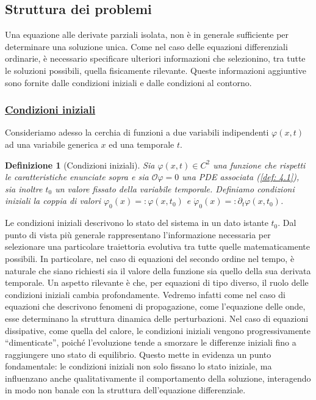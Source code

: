 \documentclass[a4paper,12pt]{report}
\newtheorem{definizione}{Definizione}[chapter]
\begin{document}
\newpage
\subsection{Struttura dei problemi}

Una equazione alle derivate parziali isolata, non è in generale sufficiente per determinare una soluzione unica. Come nel caso delle equazioni differenziali ordinarie, è necessario specificare ulteriori informazioni che selezionino, tra tutte le soluzioni possibili, quella fisicamente rilevante.
Queste informazioni aggiuntive sono fornite dalle condizioni iniziali e dalle condizioni al contorno.

\subsubsection{\underline{Condizioni iniziali}}

Consideriamo adesso la cerchia di funzioni a due variabili indipendenti $\varphi(x,t)$ ad una variabile generica $x$ ed una temporale $t$.

\begin{definizione}[Condizioni iniziali]
    Sia $\varphi(x,t)\in C^2$ una funzione che rispetti le caratteristiche enunciate sopra e sia $\mathcal{O}\varphi=0$ una PDE associata (\ref{def: 4.1}), sia inoltre $t_0$ un valore fissato della variabile temporale. Definiamo condizioni iniziali la coppia di valori $\varphi _0(x)=:\varphi(x,t_0)$ e $\dot{\varphi}_0(x)=:\partial_t\varphi(x,t_0)$.
\end{definizione}

Le condizioni iniziali descrivono lo stato del sistema in un dato istante $t_0$. Dal punto di vista più generale rappresentano l’informazione necessaria per selezionare una particolare traiettoria evolutiva tra tutte quelle matematicamente possibili. In particolare, nel caso di equazioni del secondo ordine nel tempo, è naturale che siano richiesti sia il valore della funzione sia quello della sua derivata temporale.
Un aspetto rilevante è che, per equazioni di tipo diverso, il ruolo delle condizioni iniziali cambia profondamente. Vedremo infatti come nel caso di equazioni che descrivono fenomeni di propagazione, come l’equazione delle onde, esse determinano la struttura dinamica delle perturbazioni. Nel caso di equazioni dissipative, come quella del calore, le condizioni iniziali vengono progressivamente “dimenticate”, poiché l’evoluzione tende a smorzare le differenze iniziali fino a raggiungere uno stato di equilibrio. Questo mette in evidenza un punto fondamentale: le condizioni iniziali non solo fissano lo stato iniziale, ma influenzano anche qualitativamente il comportamento della soluzione, interagendo in modo non banale con la struttura dell’equazione differenziale.
\end{document}

